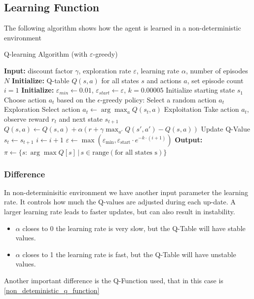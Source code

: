 \subsection{Learning Function}
The following algorithm shows how the agent is learned in a non-deterministic environment
\begin{algorithm}[H]
    \caption{Q-learning Algorithm (with $\varepsilon$-greedy)}
    \begin{algorithmic}[1]
    \State \textbf{Input:} discount factor $\gamma$, exploration rate $\varepsilon$, learning rate $\alpha$, number of episodes $N$
    \State \textbf{Initialize:} Q-table $Q(s, a)$ for all states $s$ and actions $a$, set episode count $i = 1$
    \State \textbf{Initialize:} $\varepsilon_{min} \leftarrow 0.01$, $\varepsilon_{start} \leftarrow \varepsilon$, $k = 0.00005$
        \State Initialize starting state $s_1$
            \State Choose action $a_t$ based on the $\epsilon$-greedy policy:
                \State Select a random action $a_t$ \Comment Exploration
            \Else
                \State Select action $a_t \leftarrow \arg\max_{a} Q(s_t, a)$ \Comment Exploitation
            \EndIf
            \State Take action $a_t$, observe reward $r_t$ and next state $s_{t+1}$
            \State $Q(s, a) \leftarrow Q(s, a) + \alpha \left( r + \gamma \max_{a'} Q(s', a') - Q(s, a) \right)$ \Comment Update Q-Value
            \State $s_t \leftarrow s_{t+1}$
        \EndWhile
        \State $i \leftarrow i + 1$
        \State $\varepsilon \leftarrow \max\left(\varepsilon_{\text{min}}, \varepsilon_{\text{start}} \cdot e^{-k \cdot (i+1)}\right)$
    \EndWhile
    \State \textbf{Output:} $\pi \leftarrow \{s : \arg\max Q[s] \, | \, s \in \text{range}(\text{for all states s})\}$
\end{algorithmic}
\end{algorithm}
\subsubsection{Difference}
In non-determinisitic environment we have another input parameter the learning rate.
It controls how much the Q-values are adjusted during each up-date. A larger learning rate leads to faster updates, but can also result in instability.
\begin{itemize}
    \item $\alpha$ closes to 0 the learning rate is very slow, but the Q-Table will have stable values.
    \item $\alpha$ closes to 1 the learning rate is fast, but the Q-Table will have unstable values.
\end{itemize}
Another important difference is the Q-Function used, that in this case is \ref{non_deteministic_q_function}
